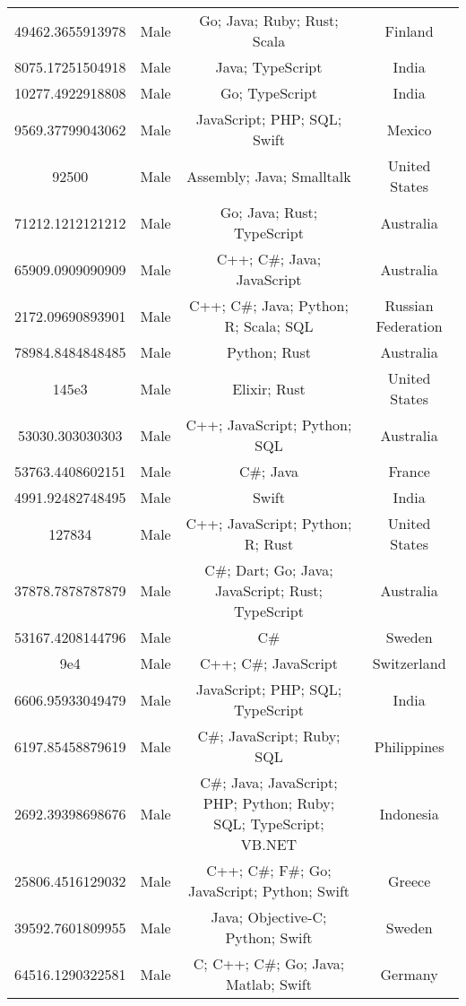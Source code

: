 \begin{center}
\begin{tabular}{ |c|c|c|c| }
49462.3655913978  &  Male  &  Go; Java; Ruby; Rust; Scala  &  Finland  \\ 
8075.17251504918  &  Male  &  Java; TypeScript  &  India  \\ 
10277.4922918808  &  Male  &  Go; TypeScript  &  India  \\ 
9569.37799043062  &  Male  &  JavaScript; PHP; SQL; Swift  &  Mexico  \\ 
92500  &  Male  &  Assembly; Java; Smalltalk  &  United States  \\ 
71212.1212121212  &  Male  &  Go; Java; Rust; TypeScript  &  Australia  \\ 
65909.0909090909  &  Male  &  C++; C\#; Java; JavaScript  &  Australia  \\ 
2172.09690893901  &  Male  &  C++; C\#; Java; Python; R; Scala; SQL  &  Russian Federation  \\ 
78984.8484848485  &  Male  &  Python; Rust  &  Australia  \\ 
145e3  &  Male  &  Elixir; Rust  &  United States  \\ 
53030.303030303  &  Male  &  C++; JavaScript; Python; SQL  &  Australia  \\ 
53763.4408602151  &  Male  &  C\#; Java  &  France  \\ 
4991.92482748495  &  Male  &  Swift  &  India  \\ 
127834  &  Male  &  C++; JavaScript; Python; R; Rust  &  United States  \\ 
37878.7878787879  &  Male  &  C\#; Dart; Go; Java; JavaScript; Rust; TypeScript  &  Australia  \\ 
53167.4208144796  &  Male  &  C\#  &  Sweden  \\ 
9e4  &  Male  &  C++; C\#; JavaScript  &  Switzerland  \\ 
6606.95933049479  &  Male  &  JavaScript; PHP; SQL; TypeScript  &  India  \\ 
6197.85458879619  &  Male  &  C\#; JavaScript; Ruby; SQL  &  Philippines  \\ 
2692.39398698676  &  Male  &  C\#; Java; JavaScript; PHP; Python; Ruby; SQL; TypeScript; VB.NET  &  Indonesia  \\ 
25806.4516129032  &  Male  &  C++; C\#; F\#; Go; JavaScript; Python; Swift  &  Greece  \\ 
39592.7601809955  &  Male  &  Java; Objective-C; Python; Swift  &  Sweden  \\ 
64516.1290322581  &  Male  &  C; C++; C\#; Go; Java; Matlab; Swift  &  Germany  \\ 

\end{tabular}
\end{center}
